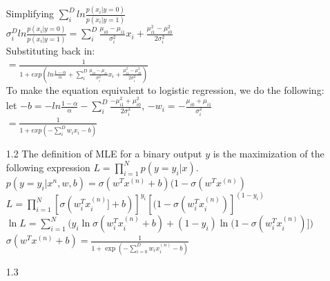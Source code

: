 \documentclass[letterpaper, 12pt]{article}
\begin{document}
\begin{itemize}
		Simplifying $\sum_i^D ln\frac{p(x_i|y = 0)}{p(x_i|y = 1)}$ \\

		$\sigma_i^D ln\frac{p(x_i|y = 0)}{p(x_i|y = 1)} = \sum_i^D\frac{\mu_{i0} - \mu_{i1}}{\sigma_i^2}x_i + \frac{\mu^2_{i1} - \mu^2_{i0}}{2\sigma^2_i}$ \\

		Substituting back in: \\

		$= \frac{1}{1 + exp(ln\frac{1 - \alpha}{\alpha} + \sum_i^D\frac{\mu_{i0} - \mu_{i1}}{\sigma_i^2}x_i + \frac{\mu^2_{i1} - \mu^2_{i0}}{2\sigma^2_i})}$ \\

		To make the equation equivalent to logistic regression, we do the following: \\

		let $-b = -ln\frac{1 - \alpha}{\alpha} - \sum_i^D \frac{-\mu^2_{i1} + \mu^2_{i0}}{2\sigma^2_i}$, $-w_i = -\frac{\mu_{i0} + \mu_{i1}}{\sigma_i^2}$ \\

		$= \frac{1}{1 + exp(-\sum_i^D w_ix_i - b)}$ \\ 




	\item[1.2]
		The definition of MLE for a binary output $y$ is the maximization of the following expression $L = \prod_{i=1}^N p(y = y_i | x)$. \\

		$p( y = y_i | x^n, w, b) = \sigma(w^Tx^{(n)} + b)(1 - \sigma(w^Tx^{(n)})$ \\

		$L = \prod_{i=1}^N [\sigma(w_i^Tx_i^{(n)}] + b)]^{y_i}[(1 - \sigma(w_i^Tx_i^{(n)})]^{(1-y_i)}$ \\

		$\ln L = \sum_{i=1}^N\Bigg( y_i \ln \sigma(w_i^Tx_i^{(n)} + b) + (1-y_i) \ln (1 - \sigma(w_i^Tx_i^{(n)})] \Bigg)$ \\

		$\sigma(w^Tx^{(n)} + b) = \frac{1}{1 + \exp(-\sum_{i=0}^D w_ix_i^{(n)} - b)}$
	\item[1.3]
\end{itemize}
\end{document}
